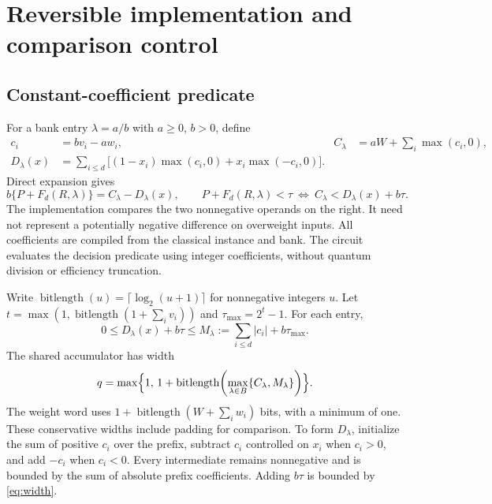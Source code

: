 \documentclass[referee,pdflatex,sn-mathphys-num]{sn-jnl}
\theoremstyle{thmstyleone}
\theoremstyle{thmstyletwo}
\begin{document}
\section{Reversible implementation and comparison control}\label{sec:circuit}
\subsection{Constant-coefficient predicate}
For a bank entry $\lambda=a/b$ with $a\geq0$, $b>0$, define
\begin{align}
 c_i&=bv_i-aw_i,& C_\lambda&=aW+\sum_i\max(c_i,0),\\
 D_\lambda(x)&=\sum_{i\leq d}\bigl[(1-x_i)\max(c_i,0)+x_i\max(-c_i,0)\bigr].\label{eq:loss}
\end{align}
Direct expansion gives
\begin{equation}\label{eq:integercompare}
 b\{P+F_d(R,\lambda)\}=C_\lambda-D_\lambda(x),\qquad
 P+F_d(R,\lambda)<\tau\ \Longleftrightarrow\ C_\lambda<D_\lambda(x)+b\tau.
\end{equation}
The implementation compares the two nonnegative operands on the right. It need not represent a potentially negative difference on overweight inputs. All coefficients are compiled from the classical instance and bank. The circuit evaluates the decision predicate using integer coefficients, without quantum division or efficiency truncation.

Write $\operatorname{bitlength}(u)=\lceil\log_2(u+1)\rceil$ for nonnegative integers $u$. Let $t=\max(1,\operatorname{bitlength}(1+\sum_i v_i))$ and $\tau_{\max}=2^t-1$. For each entry,
\begin{equation}\label{eq:width}
 0\leq D_\lambda(x)+b\tau\leq M_\lambda:=\sum_{i\leq d}|c_i|+b\tau_{\max}.
\end{equation}
The shared accumulator has width
\begin{equation}
 q=\max\Bigl\{1,\,1+\operatorname{bitlength}\!\left(\max_{\lambda\in B}\{C_\lambda,M_\lambda\}\right)\Bigr\}.
\end{equation}
The weight word uses $1+\operatorname{bitlength}(W+\sum_iw_i)$ bits, with a minimum of one. These conservative widths include padding for comparison. To form $D_\lambda$, initialize the sum of positive $c_i$ over the prefix, subtract $c_i$ controlled on $x_i$ when $c_i>0$, and add $-c_i$ when $c_i<0$. Every intermediate remains nonnegative and is bounded by the sum of absolute prefix coefficients. Adding $b\tau$ is bounded by \eqref{eq:width}.
\end{document}
